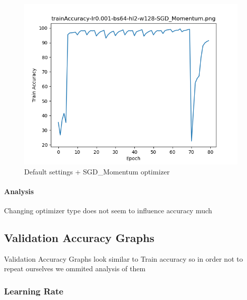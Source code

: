 \documentclass{article}[12pt]
\begin{document}
        \begin{figure}[H]
        \includegraphics[width=\linewidth]{testsResults/trainAccuracy/trainAccuracy-lr0.001-bs64-hl2-w128-SGD_Momentum.png}
        \caption{Default settings + SGD\_Momentum optimizer}
        \endminipage
    \end{figure}

    \paragraph{Analysis} Changing optimizer type does not seem to influence accuracy much

\subsection{Validation Accuracy Graphs}
Validation Accuracy Graphs look similar to Train accuracy so in order not to repeat ourselves we ommited analysis of them


\subsubsection{Learning Rate}
\end{document}
